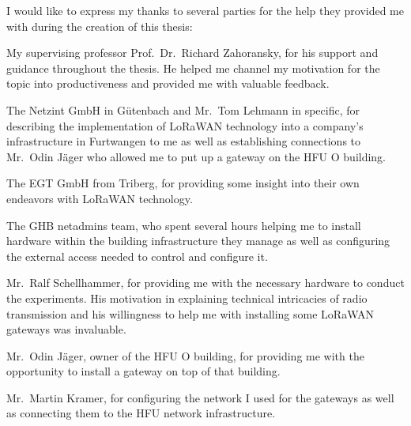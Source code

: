 I would like to express my thanks to several parties for the help they provided me with during the creation of this thesis:

My supervising professor Prof.\ Dr.\ Richard Zahoransky, for his support and guidance throughout the thesis.
He helped me channel my motivation for the topic into productiveness and provided me with valuable feedback.

The Netzint GmbH in Gütenbach and Mr.\ Tom Lehmann in specific, for describing the implementation of \ac{LoRaWAN} technology into a company's infrastructure in Furtwangen to me as well as establishing connections to Mr.\ Odin Jäger who allowed me to put up a gateway on the \ac{HFU} O building.

The EGT GmbH from Triberg, for providing some insight into their own endeavors with \ac{LoRaWAN} technology.

The \ac{GHB} netadmins team, who spent several hours helping me to install hardware within the building infrastructure they manage as well as configuring the external access needed to control and configure it.

Mr.\ Ralf Schellhammer, for providing me with the necessary hardware to conduct the experiments.
His motivation in explaining technical intricacies of radio transmission and his willingness to help me with installing some \ac{LoRaWAN} gateways was invaluable.

Mr.\ Odin Jäger, owner of the \ac{HFU} O building, for providing me with the opportunity to install a gateway on top of that building.

Mr.\ Martin Kramer, for configuring the network I used for the gateways as well as connecting them to the \ac{HFU} network infrastructure.

